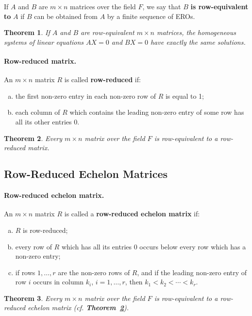 \documentclass{article}
\newtheorem{theorem}{Theorem}
\begin{document}
If $A$ and $B$ are $m \times n$ matrices over the field $F$, we say that $B$
\textbf{is row-equivalent to} $A$ if $B$ can be obtained from $A$ by a finite
sequence of EROs.

\begin{theorem}
  If $A$ and $B$ are row-equivalent $m \times n$ matrices, the homogeneous
  systems of linear equations $AX = 0$ and $BX = 0$ have exactly the same
  solutions.
\end{theorem}

\paragraph{Row-reduced matrix.} An $m \times n$ matrix $R$ is called
\textbf{row-reduced} if:
\begin{enumerate}[(a)]
  \item the first non-zero entry in each non-zero row of $R$ is equal to 1;
  \item each column of $R$ which contains the leading non-zero entry of some
    row has all its other entries 0.
\end{enumerate}

\begin{theorem} \label{thm:4}
  Every $m \times n$ matrix over the field $F$ is row-equivalent to a
  row-reduced matrix.
\end{theorem}

\subsection{Row-Reduced Echelon Matrices}

\paragraph{Row-reduced echelon matrix.} An $m \times n$ matrix $R$ is called a
\textbf{row-reduced echelon matrix} if:
\begin{enumerate}[(a)]
  \item $R$ is row-reduced;
  \item every row of $R$ which has all its entries 0 occurs below every row
    which has a non-zero entry;
  \item if rows $1, \ldots, r$ are the non-zero rows of $R$, and if the leading
    non-zero entry of row $i$ occurs in column $k_i$, $i = 1, \ldots, r$, then
    $k_1 < k_2 < \cdots < k_r$.
\end{enumerate}

\begin{theorem}
  Every $m \times n$ matrix over the field $F$ is row-equivalent to a
  row-reduced echelon matrix (cf. \textbf{Theorem~\ref{thm:4}}).
\end{theorem}
\end{document}
